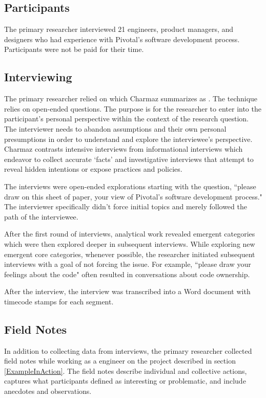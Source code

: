 \subsection{Participants}
The primary researcher interviewed 21 engineers, product managers, and designers who had experience with Pivotal's software development process. Participants were not be paid for their time. 
\subsection{Interviewing}
The primary researcher relied on  which Charmaz summarizes as  \cite{Charmaz}. The technique relies on open-ended questions. The purpose is for the researcher to enter into the participant's personal perspective within the context of the research question. The interviewer needs to abandon assumptions and their own personal presumptions in order to understand and explore the interviewee's perspective. Charmaz \cite{Charmaz} contrasts intensive interviews from informational interviews which endeavor to collect accurate `facts' and investigative interviews that attempt to reveal hidden intentions or expose practices and policies. 
 
The interviews were open-ended explorations starting with the question, ``please draw on this sheet of paper, your view of Pivotal's software development process." The interviewer specifically didn't force initial topics and merely followed the path of the interviewee. 

After the first round of interviews, analytical work revealed emergent categories which were then explored deeper in subsequent interviews. While exploring new emergent core categories, whenever possible, the researcher initiated subsequent interviews with a goal of not forcing the issue. For example, ``please draw your feelings about the code" often resulted in conversations about code ownership. 

After the interview, the interview was transcribed into a Word document with timecode stamps for each segment.

\subsection{Field Notes}
In addition to collecting data from interviews, the primary researcher collected field notes while working as a engineer on the project described in section \ref{ExampleInAction}. The field notes describe individual and collective actions, captures what participants defined as interesting or problematic, and include anecdotes and observations. 
